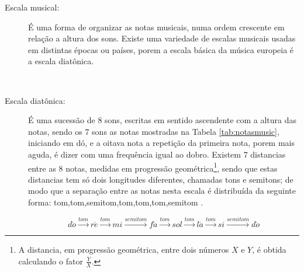 \begin{description}
\item [Escala musical:] \label{sec:pos:Escala}
É uma forma de organizar as notas musicais, numa ordem crescente em relação a altura dos sons.
Existe uma variedade de escalas musicais usadas em distintas épocas ou países, 
porem a escala básica da música europeia é a escala diatônica. \cite[pp. 753]{apel1969harvard}
\begin{example}~
\end{example}



\item [Escala diatônica:] \label{sec:pos:Diatonica}
É uma sucessão de 8 sons,  escritas em sentido ascendente com a altura das notas, 
sendo os 7 sons as notas mostradas na Tabela \ref{tab:notasmusic}, iniciando em dó,
e a oitava nota a repetição da primeira nota, 
porem mais aguda, é dizer com uma frequência igual ao dobro.
Existem 7 distancias entre as 8 notas, medidas em progressão geométrica\footnote{A 
distancia, em progressão geométrica, entre dois números $X$ e $Y$, é obtida calculando o fator $\frac{Y}{X}$. }, 
sendo que estas distancias tem só dois longitudes diferentes, chamadas tons e semitons;
de modo que a separação entre as notas nesta escala é distribuída da seguinte forma: 
tom,tom,semitom,tom,tom,tom,semitom \cite[pp. 30]{cardoso1973curso}\cite[pp. 753]{apel1969harvard}.
\begin{example}
\begin{equation*}
d\acute{o}\overset{tom}{\rightarrow}
r\acute{e}\overset{tom}{\rightarrow}
mi\overset{semitom}{\rightarrow}
f\acute{a}\overset{tom}{\rightarrow}
sol\overset{tom}{\rightarrow}
l\acute{a}\overset{tom}{\rightarrow}
si\overset{semitom}{\rightarrow}
d\acute{o}
\end{equation*}
\end{example}


\end{description}
